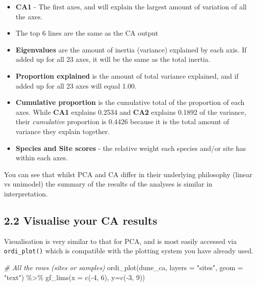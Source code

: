 \documentclass[
]{article}
\newenvironment{Shaded}{\begin{snugshade}}{\end{snugshade}}
\newcommand{\AttributeTok}[1]{\textcolor[rgb]{0.77,0.63,0.00}{#1}}
\newcommand{\CommentTok}[1]{\textcolor[rgb]{0.56,0.35,0.01}{\textit{#1}}}
\newcommand{\DecValTok}[1]{\textcolor[rgb]{0.00,0.00,0.81}{#1}}
\newcommand{\FunctionTok}[1]{\textcolor[rgb]{0.00,0.00,0.00}{#1}}
\newcommand{\NormalTok}[1]{#1}
\newcommand{\SpecialCharTok}[1]{\textcolor[rgb]{0.00,0.00,0.00}{#1}}
\newcommand{\StringTok}[1]{\textcolor[rgb]{0.31,0.60,0.02}{#1}}
\providecommand{\tightlist}{%
  \setlength{\itemsep}{0pt}\setlength{\parskip}{0pt}}
\begin{document}
\begin{itemize}
\tightlist
\item
  \textbf{CA1} - The first axes, and will explain the largest amount of
  variation of all the axes.
\item
  The top 6 lines are the same as the CA output
\item
  \textbf{Eigenvalues} are the amount of inertia (variance) explained by
  each axis. If added up for all 23 axes, it will be the same as the
  total inertia.
\item
  \textbf{Proportion explained} is the amount of total variance
  explained, and if added up for all 23 axes will equal 1.00.
\item
  \textbf{Cumulative proportion} is the cumulative total of the
  proportion of each axes. While \textbf{CA1} explains 0.2534 and
  \textbf{CA2} explains 0.1892 of the variance, their \emph{cumulative}
  proportion is 0.4426 because it is the total amount of variance they
  explain together.
\item
  \textbf{Species and Site scores} - the relative weight each species
  and/or site has within each axes.
\end{itemize}

You can see that whilst PCA and CA differ in their underlying philosophy
(linear vs unimodel) the summary of the results of the analyses is
similar in interpretation.

\hypertarget{visualise-your-ca-results}{%
\subsection{2.2 Visualise your CA
results}\label{visualise-your-ca-results}}

Visualisation is very similar to that for PCA, and is most easily
accessed via \texttt{ordi\_plot()} which is compatible with the plotting
system you have already used.

\begin{Shaded}
\begin{Highlighting}[]
\CommentTok{\# All the rows (sites or samples)}
\FunctionTok{ordi\_plot}\NormalTok{(dune\_ca, }\AttributeTok{layers =} \StringTok{"sites"}\NormalTok{, }\AttributeTok{geom =} \StringTok{"text"}\NormalTok{) }\SpecialCharTok{\%\textgreater{}\%} 
  \FunctionTok{gf\_lims}\NormalTok{(}\AttributeTok{x =} \FunctionTok{c}\NormalTok{(}\SpecialCharTok{{-}}\DecValTok{4}\NormalTok{, }\DecValTok{6}\NormalTok{), }\AttributeTok{y=}\FunctionTok{c}\NormalTok{(}\SpecialCharTok{{-}}\DecValTok{3}\NormalTok{, }\DecValTok{9}\NormalTok{))}
\end{Highlighting}
\end{Shaded}
\end{document}
